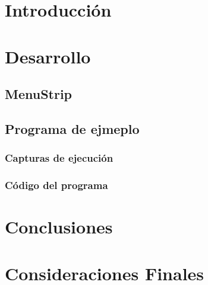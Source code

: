 \documentclass{extbook}
\begin{document}

\tableofcontents
\listoffigures
\chapter{Introducción}

\chapter{Desarrollo}
\section{MenuStrip}

\section{Programa de ejmeplo}
\subsection{Capturas de ejecución}

\subsection{Código del programa}

\chapter{Conclusiones}

\chapter{Consideraciones Finales}

\end{document}
